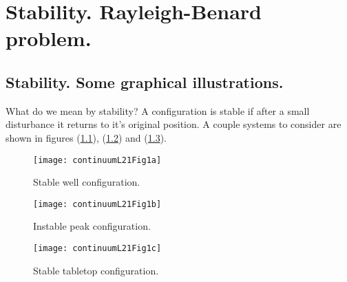 %
%

\chapter{Stability.  Rayleigh-Benard problem.}
\label{chap:continuumL21}
{}
\date{Mar 29, 2012}

\beginArtWithToc

%
%
\section{Stability.  Some graphical illustrations.}

What do we mean by stability?  A configuration is stable if after a small disturbance it returns to it's original position.  A couple systems to consider are shown in figures (\ref{fig:continuumL21:continuumL21Fig1a}), (\ref{fig:continuumL21:continuumL21Fig1b}) and (\ref{fig:continuumL21:continuumL21Fig1c}).

\begin{figure}[htp]
   \centering
   \texttt{[image: continuumL21Fig1a]}
   \caption{Stable well configuration.}\label{fig:continuumL21:continuumL21Fig1a}
\end{figure}
\begin{figure}[htp]
   \centering
   \texttt{[image: continuumL21Fig1b]}
   \caption{Instable peak configuration.}\label{fig:continuumL21:continuumL21Fig1b}
\end{figure}
\begin{figure}[htp]
   \centering
   \texttt{[image: continuumL21Fig1c]}
   \caption{Stable tabletop configuration.}\label{fig:continuumL21:continuumL21Fig1c}
\end{figure}

